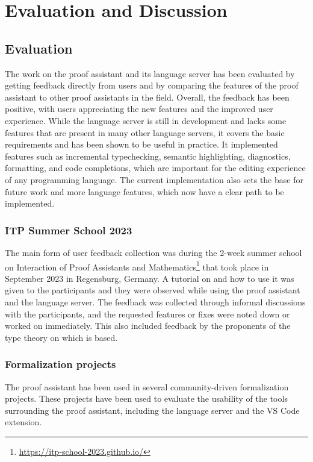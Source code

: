 \chapter{Evaluation and Discussion}
\label{chap:eval}

\section{Evaluation}

The work on the \Rzk{} proof assistant and its language server has been evaluated
by getting feedback directly from users and by comparing the features of the proof assistant
to other proof assistants in the field.
Overall, the feedback has been positive, with users appreciating the new features
and the improved user experience.
While the language server is still in development and lacks some features that are present in
many other language servers, it covers the basic requirements and has been shown to be useful in practice.
It implemented features such as incremental typechecking, semantic highlighting, diagnostics, formatting,
and code completions, which are important for the editing experience of any programming language.
The current implementation also sets the base for future work and more language features,
which now have a clear path to be implemented.

\subsection{ITP Summer School 2023}

The main form of user feedback collection was during the 2-week summer school on
Interaction of Proof Assistants and Mathematics\footnote{\url{https://itp-school-2023.github.io/}}
that took place in September 2023 in Regensburg, Germany.
A tutorial on \Rzk{} and how to use it was given to the participants and they were
observed while using the proof assistant and the language server.
The feedback was collected through informal discussions with the participants,
and the requested features or fixes were noted down or worked on immediately.
This also included feedback by the proponents of the type theory on which \Rzk{} is based.

\subsection{Formalization projects}

The \Rzk{} proof assistant has been used in several community-driven formalization projects.
These projects have been used to evaluate the usability of the tools surrounding the
proof assistant, including the language server and the VS Code extension.

